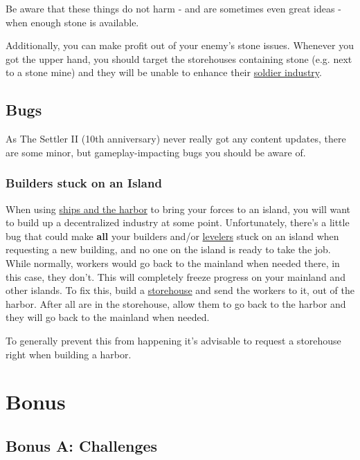 \documentclass[12pt]{article}
\begin{document}
Be aware that these things do not harm - and are sometimes even great ideas - when enough stone is available.

Additionally, you can make profit out of your enemy's stone issues. Whenever you got the upper hand, you should target the storehouses containing stone (e.g. next to a stone mine) and they will be unable to enhance their \hyperref[sec:soldiers]{soldier industry}.

\subsection{Bugs}
\label{sec:bugs}

As The Settler II (10th anniversary) never really got any content updates, there are some minor, but gameplay-impacting bugs you should be aware of.

\subsubsection{Builders stuck on an Island}
\label{sec:buildersstuckonisland}

When using \hyperref[sec:shipsandharbor]{ships and the harbor} to bring your forces to an island, you will want to build up a decentralized industry at some point. Unfortunately, there's a little bug that could make \textbf{all} your builders and/or \hyperref[sec:leveler]{levelers} stuck on an island when requesting a new building, and no one on the island is ready to take the job. While normally, workers would go back to the mainland when needed there, in this case, they don't. This will completely freeze progress on your mainland and other islands. To fix this, build a \hyperref[sec:storehouse]{storehouse} and send the workers to it, out of the harbor. After all are in the storehouse, allow them to go back to the harbor and they will go back to the mainland when needed.

To generally prevent this from happening it's advisable to request a storehouse right when building a harbor.

\section{Bonus}
\label{sec:bonus}

\subsection{Bonus A: Challenges}
\label{sec:challenges}
\end{document}
